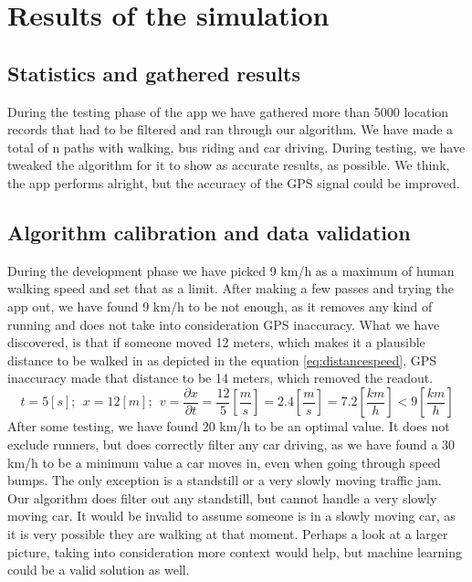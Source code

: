 \chapter{Results of the simulation}
\section{Statistics and gathered results}

During the testing phase of the app we have gathered more than 5000 location records that had to be filtered and ran through our algorithm. We have made a total of n paths with walking, bus riding and car driving. During testing, we have tweaked the algorithm for it to show as accurate results, as possible. We think, the app performs alright, but the accuracy of the GPS signal could be improved.

\section{Algorithm calibration and data validation}

During the development phase we have picked 9 km/h as a maximum of human walking speed and set that as a limit. After making a few passes and trying the app out, we have found 9 km/h to be not enough, as it removes any kind of running and does not take into consideration GPS inaccuracy. What we have discovered, is that if someone moved 12 meters, which makes it a plausible distance to be walked in as depicted in the equation \ref{eq:distancespeed}, GPS inaccuracy made that distance to be 14 meters, which removed the readout.
\begin{equation} \label{eq:distancespeed}
    t = 5[s];~~ x = 12[m];~~ v = \frac{\partial x}{\partial t} = \frac{12}{5} [\frac{m}{s}] = 2.4 [\frac{m}{s}] = 7.2 [\frac{km}{h}] < 9 [\frac{km}{h}]
\end{equation}
After some testing, we have found 20 km/h to be an optimal value. It does not exclude runners, but does correctly filter any car driving, as we have found a 30 km/h to be a minimum value a car moves in, even when going through speed bumps. The only exception is a standstill or a very slowly moving traffic jam. Our algorithm does filter out any standstill, but cannot handle a very slowly moving car. It would be invalid to assume someone is in a slowly moving car, as it is very possible they are walking at that moment. Perhaps a look at a larger picture, taking into consideration more context would help, but machine learning could be a valid solution as well.

